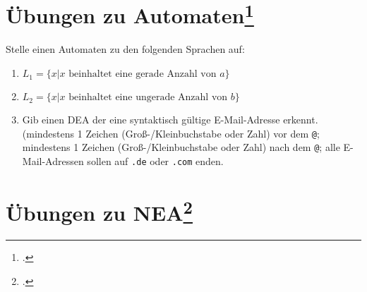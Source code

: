 \documentclass{lehramt-informatik-aufgabe}
\begin{document}
%

\section{Übungen zu Automaten\footcite[Seite 28]{theo:fs:1}}

Stelle einen Automaten zu den folgenden Sprachen auf:

\begin{enumerate}

%

\item $L_1 = \{ x | x \text{ beinhaltet eine gerade Anzahl von } a \}$

\item $L_2 = \{ x | x \text{ beinhaltet eine ungerade Anzahl von } b \}$

\item Gib einen DEA der eine syntaktisch gültige E-Mail-Adresse erkennt.
(mindestens 1 Zeichen (Groß-/Kleinbuchstabe oder Zahl) vor dem
\texttt{@}; mindestens 1 Zeichen (Groß-/Kleinbuchstabe oder Zahl) nach
dem \texttt{@}; alle E-Mail-Adressen sollen auf \texttt{.de} oder
\texttt{.com} enden.

\end{enumerate}

%

\section{Übungen zu NEA\footcite[Seite 34]{theo:fs:1}}
\end{document}
